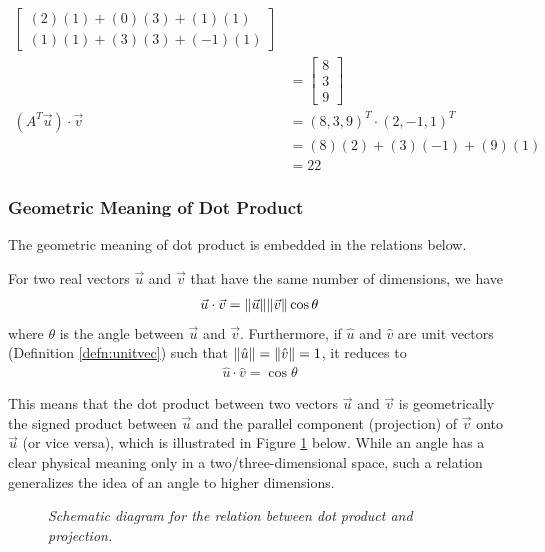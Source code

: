 \begin{solution}
\begin{align*}
\begin{bmatrix}
(2)(1) + (0)(3) + (1)(1) \\
(1)(1) + (3)(3) + (-1)(1) 
\end{bmatrix} \\
&=
\begin{bmatrix}
8 \\
3 \\
9
\end{bmatrix} \\
(A^T\vec{u}) \cdot \vec{v} &= (8,3,9)^T \cdot (2,-1,1)^T \\
&= (8)(2) + (3)(-1) + (9)(1) \\
&= 22
\end{align*}
\end{solution}

\subsubsection{Geometric Meaning of Dot Product}
The geometric meaning of dot product is embedded in the relations below.
\begin{proper}
\label{proper:dotgeo}
For two real vectors $\vec{u}$ and $\vec{v}$ that have the same number of dimensions, we have
\begin{align}
\vec{u} \cdot \vec{v} = \norm{\vec{u}}\norm{\vec{v}}\cos\theta \label{eqn:dotgeo}
\end{align}
where $\theta$ is the angle between $\vec{u}$ and $\vec{v}$. Furthermore, if $\hat{u}$ and $\hat{v}$ are unit vectors (Definition \ref{defn:unitvec}) such that $\norm{\hat{u}} = \norm{\hat{v}} = 1$, it reduces to
\begin{align}
\label{eqn:unitvecsangle}
\hat{u} \cdot \hat{v} = \cos\theta    
\end{align}
\end{proper}
This means that the dot product between two vectors $\vec{u}$ and $\vec{v}$ is geometrically the signed product between $\vec{u}$ and the parallel component (projection) of $\vec{v}$ onto $\vec{u}$ (or vice versa), which is illustrated in Figure \ref{fig:dotproj} below. While an angle has a clear physical meaning only in a two/three-dimensional space, such a relation generalizes the idea of an angle to higher dimensions.
\begin{figure}[ht!]
    \centering
    \caption{\textit{Schematic diagram for the relation between dot product and projection.}}
    \label{fig:dotproj}
\end{figure}
